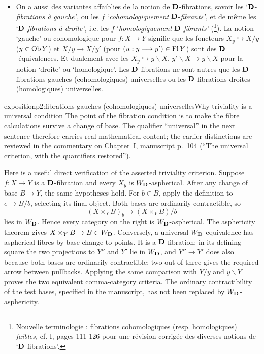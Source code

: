 \begin{itemize}
\item[(vi)] On a aussi des variantes affaiblies de la notion de $\mathbf{D}$-fibrations, savoir les ‘$\mathbf{D}$-\textit{fibrations à gauche’,} ou les $f$ ‘\textit{cohomologiquement} $\mathbf{D}$-\textit{fibrants’,} et de même les ‘$\mathbf{D}$-\textit{fibrations à droite’,} i.e. les $f$ ‘\textit{homologiquement} $\mathbf{D}$-\textit{fibrants’} (\footnote{Nouvelle terminologie : fibrations cohomologiques (resp. homologiques) \textit{faibles,} cf. I, pages 111-126 pour une révision corrigée des diverses notions de ‘$\mathbf{D}$-fibrations’.}). La notion ‘gauche’
ou cohomologique pour $f : X \longrightarrow Y$ signifie que les foncteurs $X_y \hookrightarrow X/y$ ($y \in \operatorname{Ob} Y$) et $X/y \longrightarrow X/y'$ (pour $(u : y \longrightarrow y') \in \operatorname{Fl} Y$) sont des $\mathbf{D}$-équivalences. Et dualement avec les $X_y \hookrightarrow y\backslash X$, $y'\backslash X \longrightarrow y\backslash X$ pour la notion ‘droite’ ou ‘homologique’. Les $\mathbf{D}$-fibrations ne sont autres que les $\mathbf{D}$-fibrations gauches (cohomologiques) universelles ou les $\mathbf{D}$-fibrations droites (homologiques) universelles.
\end{itemize}

\begin{dcomment}{exposition}{p2:fibrations gauches (cohomologiques) universelles}{Why triviality is a universal condition}
The point of the fibration condition is to make the fibre calculations survive a change of base. The qualifier ``universal'' in the next sentence therefore carries real mathematical content; the earlier distinctions are reviewed in the commentary on Chapter~I, manuscript p.~104 (``The universal criterion, with the quantifiers restored'').

Here is a useful direct verification of the asserted triviality criterion. Suppose $f:X\to Y$ is a $\mathbf{D}$-fibration and every $X_y$ is $W_{\mathbf{D}}$-aspherical. After any change of base $B\to Y$, the same hypotheses hold. For $b\in B$, apply the definition to $e\to B/b$, selecting its final object. Both bases are ordinarily contractible, so
\[
 (X\times_Y B)_b\longrightarrow (X\times_Y B)/b
\]
lies in $W_{\mathbf{D}}$. Hence every category on the right is $W_{\mathbf{D}}$-aspherical. The asphericity theorem gives $X\times_Y B\to B\in W_{\mathbf{D}}$. Conversely, a universal $W_{\mathbf{D}}$-equivalence has aspherical fibres by base change to points. It is a $\mathbf{D}$-fibration: in its defining square the two projections to $Y''$ and $Y'$ lie in $W_{\mathbf{D}}$, and $Y''\to Y'$ does also because both bases are ordinarily contractible; two-out-of-three gives the required arrow between pullbacks. Applying the same comparison with $Y/y$ and $y\backslash Y$ proves the two equivalent comma-category criteria. The ordinary contractibility of the test bases, specified in the manuscript, has not been replaced by $W_{\mathbf{D}}$-asphericity.
\end{dcomment}



